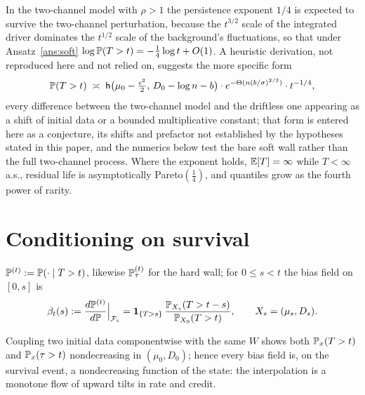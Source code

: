 \begin{proposition}\label{thm:transfer}
In the two-channel model with $\rho>1$ the persistence exponent
$1/4$ is expected to survive the two-channel perturbation, because
the $t^{3/2}$ scale of the integrated driver dominates the $t^{1/2}$
scale of the background's fluctuations, so that under
Ansatz~\ref{ans:soft} $\log\mathbb{P}(T>t)=-\tfrac14\log t+O(1)$. A heuristic derivation, not reproduced here and not relied on, suggests
the more specific form
\begin{equation}\label{eq:transfer}
\mathbb{P}(T>t)\;\asymp\;
\mathsf{h}\bigl(\mu_0-\tfrac{\epsilon^2}{2},\,D_0-\log n-b\bigr)\cdot
e^{-\Theta(n(b/\sigma)^{2/3})}\cdot t^{-1/4},
\end{equation}
every difference between the two-channel model and the driftless one
appearing as a shift of initial data or a bounded multiplicative
constant; that form is entered here as a conjecture, its shifts and
prefactor not established by the hypotheses stated in this paper, and
the numerics below test the bare soft wall rather than the full
two-channel process. Where the exponent holds, $\mathbb{E}[T]=\infty$ while
$T<\infty$ a.s., residual life is asymptotically Pareto$(\tfrac14)$,
and quantiles grow as the fourth power of rarity.
\end{proposition}

\section{Conditioning on survival}\label{sec:cond}

\begin{definition}
\label{def:interp}
$\mathbb{P}^{(t)}:=\mathbb{P}(\cdot\mid T>t)$, likewise $\mathbb{P}^{(t)}_\tau$ for the
hard wall; for $0\le s<t$ the bias field on $[0,s]$ is
\begin{equation}\label{eq:bias}
\beta_t(s):=\frac{d\mathbb{P}^{(t)}}{d\mathbb{P}}\Big|_{\mathcal{F}_s}
=\mathbf{1}_{\{T>s\}}\,\frac{\mathbb{P}_{X_s}(T>t-s)}{\mathbb{P}_{X_0}(T>t)},
\qquad X_s=(\mu_s,D_s).
\end{equation}
\end{definition}

\begin{lemma}\label{lem:monotone}
Coupling two initial data componentwise with the same $W$ shows both
$\mathbb{P}_x(T>t)$ and $\mathbb{P}_x(\tau>t)$ nondecreasing in $(\mu_0,D_0)$;
hence every bias field is, on the survival event, a nondecreasing
function of the state: the interpolation is a monotone flow of upward
tilts in rate and credit.
\end{lemma}

